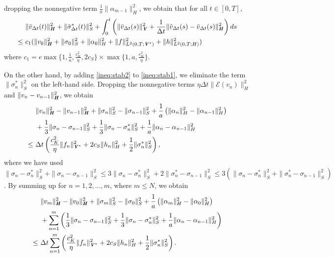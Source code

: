 \documentclass[11pt, a4paper]{article}
\newcommand{\dt}{{\Delta t}}
\newcommand{\E}{{\mathcal{E}}}
\newcommand{\bm}[1]{\textbf{\textit{#1}}}%
\newcommand{\Hv}{{\bm{H}}}
\newcommand{\Vv}{{\bm{V}}}
\newcommand{\Hs}{{H}}
\newcommand{\sigmas}[1]{{\sigma_{#1}^*}}
\begin{document}
dropping the nonnegative term $\frac{1}{a}\|\alpha_{m-1}\|_\Hs^2$, we obtain that for all $t\in[0,T]$,
\begin{align}\label{ineq:stabfinal1}\begin{aligned}
    &\|\bar{v}_\dt(t)\|_\Hv^2 
    + \|\bar{\sigma}_\dt^*(t)\|_S^2
    + \int_0^t\left(\|\bar{v}_\dt(s)\|_\Vv^2
    + \frac{1}{\dt}\|\hat{v}_\dt(s)-\bar{v}_\dt(s)\|_\Hv^2 \right)ds\\
    \le~& c_1(\|v_0\|_\Hv^2 + \|\sigma_0\|_S^2 + \|\alpha_0\|_\Hs^2 + \|f\|_{L^2(0,T;\Vv^*)}^2 + \|h\|_{L^2(0,T;\Hs)}^2)
\end{aligned}\end{align}
where $c_1=e\max\{1,\frac{1}{a},\frac{c_K^2}{\eta},2c_S\}\times\max\{1,a,\frac{c_K^2}{\eta}\}$. 

On the other hand, by adding \eqref{ineq:stab2} to \eqref{ineq:stab1}, we eliminate the term $\|\sigmas{n}\|_S^2$ on the left-hand side. 
Dropping the nonnegative terms $\eta \dt\|\E(v_n)\|_\Hs^2$ and $\|v_n-v_{n-1}\|_\Hv^2$, we obtain
\begin{align*}
    &\|v_n\|_\Hv^2 - \|v_{n-1}\|_\Hv^2
    + \|\sigma_{n}\|_S^2 - \|\sigma_{n-1}\|_S^2
    +\frac{1}{a}\left(\|\alpha_n\|_\Hs^2 - \|\alpha_{n-1}\|_\Hs^2\right)\\
    &+ \frac{1}{3}\|\sigma_n - \sigma_{n-1}\|_S^2
    + \frac{1}{3}\|\sigma_n - \sigmas{n}\|_S^2
    + \frac{1}{a}\|\alpha_n - \alpha_{n-1}\|_\Hs^2\\
    \le~& \dt\left(\frac{c_K^2}{\eta}\|f_n\|_{\Vv^*}^2 + 2c_S\|h_n\|_\Hs^2 + \frac{1}{2}\|\sigmas{n}\|_S^2\right),
\end{align*}
where we have used $\|\sigma_n-\sigmas{n}\|_S^2 + \|\sigma_n-\sigma_{n-1}\|_S^2 \le 3\|\sigma_n-\sigmas{n}\|_S^2 + 2\|\sigmas{n}-\sigma_{n-1}\|_S^2 \le 3(\|\sigma_n-\sigmas{n}\|_S^2 + \|\sigmas{n}-\sigma_{n-1}\|_S^2)$.
By summing up for $n = 1,2,\ldots,m$, where $m\le N$, we obtain
\begin{align*}\begin{aligned}
    &\|v_m\|_\Hv^2 - \|v_0\|_\Hv^2
    + \|\sigma_{m}\|_S^2 - \|\sigma_{0}\|_S^2
    +\frac{1}{a}\left(\|\alpha_m\|_\Hs^2 - \|\alpha_{0}\|_\Hs^2\right)\\
    &+ \sum_{n=1}^m\left(\frac{1}{3}\|\sigma_n - \sigma_{n-1}\|_S^2
    + \frac{1}{3}\|\sigma_n - \sigmas{n}\|_S^2
    + \frac{1}{a}\|\alpha_n - \alpha_{n-1}\|_\Hs^2\right)\\
    \le~& \dt\sum_{n=1}^m\left(\frac{c_K^2}{\eta}\|f_n\|_{\Vv^*}^2 + 2c_S\|h_n\|_\Hs^2 + \frac{1}{2}\|\sigmas{n}\|_S^2\right).
\end{aligned}\end{align*}
\end{document}
